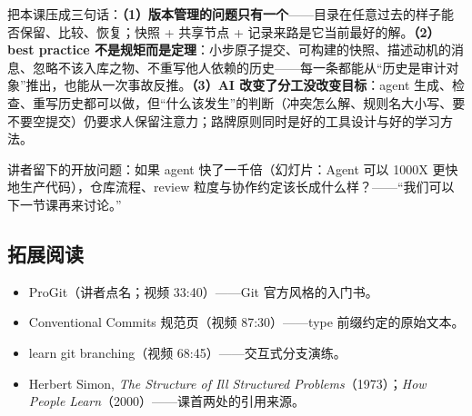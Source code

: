 \documentclass[a4paper]{article}
\begin{document}
把本课压成三句话：\textbf{（1）版本管理的问题只有一个}——目录在任意过去的样子能否保留、比较、恢复；快照 + 共享节点 + 记录来路是它当前最好的解。\textbf{（2）best practice 不是规矩而是定理}：小步原子提交、可构建的快照、描述动机的消息、忽略不该入库之物、不重写他人依赖的历史——每一条都能从“历史是审计对象”推出，也能从一次事故反推。\textbf{（3）AI 改变了分工没改变目标}：agent 生成、检查、重写历史都可以做，但“什么该发生”的判断（冲突怎么解、规则名大小写、要不要空提交）仍要求人保留注意力；路牌原则同时是好的工具设计与好的学习方法。

讲者留下的开放问题：如果 agent 快了一千倍（幻灯片：Agent 可以 1000X 更快地生产代码），仓库流程、review 粒度与协作约定该长成什么样？——“我们可以下一节课再来讨论。”

\subsection{拓展阅读}
\begin{itemize}
\item ProGit（讲者点名；视频 33:40）——Git 官方风格的入门书。
\item Conventional Commits 规范页（视频 87:30）——type 前缀约定的原始文本。
\item learn git branching（视频 68:45）——交互式分支演练。
\item Herbert Simon, \emph{The Structure of Ill Structured Problems}（1973）；\emph{How People Learn}（2000）——课首两处的引用来源。
\end{itemize}

\end{document}
